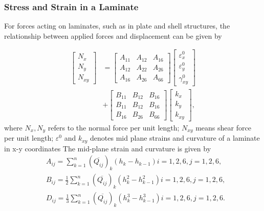 \documentclass[letterpaper]{IEEEtran}
\begin{document}
\subsubsection{Stress and Strain in a Laminate}
For forces acting on laminates, such as in plate and shell
structures, the relationship between applied forces and displacement
can be given by

\begin{equation} \label{eq:force_and_moments}
	\begin{array}{ll}
	\begin{bmatrix}
		N_x \\
		N_y \\
		N_{xy}
	\end{bmatrix}
	&=
	\begin{bmatrix}
		A_{11} & A_{12} & A_{16} \\
		A_{12} & A_{22} & A_{26} \\
		A_{16} & A_{26} & A_{66} 
	\end{bmatrix}
    \begin{bmatrix}
		\varepsilon_x^0 \\
        \varepsilon_y^0 \\
		\gamma_{xy}^0
    \end{bmatrix}   \\
	&+               
	\begin{bmatrix}
		B_{11} & B_{12} & B_{16} \\
		B_{11} & B_{12} & B_{16} \\
		B_{16} & B_{26} & B_{66} 
	\end{bmatrix}
	\begin{bmatrix}
		k_x \\
		k_y \\
		k_{xy} 
	\end{bmatrix}  \textstyle{,}
	\end{array}
\end{equation}
where $N_x,N_y $ refers to the normal force per unit length;
$N_{xy}$ means shear force per unit length;
$\varepsilon^{0}$ and $k_{xy}$ denotes  mid plane strains and curvature of a laminate in x-y coordinates
The mid-plane strain and curvature is given by
\begin{equation}
    \begin{split}
	&A_{ij}=\sum_{k=1}^{n}(\overline{Q_{ij}})_k(h_k-h_{k-1})  i=1,2,6, j=1,2,6 \textstyle{,}\\
    &B_{ij}=\frac{1}{2}\sum_{k=1}^{n}(\overline{Q_{ij}})_k(h_k^2 - h_{k-1}^2)  i=1,2,6, j=1,2,6\textstyle{,}\\
    &D_{ij}=\frac{1}{3}\sum_{k=1}^{n}(\overline{Q_{ij}})_k(h_k^3 - h_{k-1}^3) i=1,2,6, j=1,2,6\textstyle{.}\\
    \end{split}
\end{equation}
\end{document}
